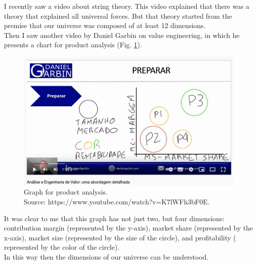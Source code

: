 \documentclass{book}
\begin{document}
I recently saw a video about string theory. This video explained that there was a theory that explained all universal forces. But that theory started from the premise that our universe was composed of at least 12 dimensions. \\

Then I saw another video by Daniel Garbin on value engineering, in which he presents a chart for product analysis (Fig. \ref{fig:productAnalisys}). 

\begin{figure}[h]
	\begin{center}
	    \caption{Graph for product analysis. \\ Source: https://www.youtube.com/watch?v=K7lWFh3bF0E.}
		\label{fig:productAnalisys}
		\centering
		\includegraphics[width=\textwidth]{figures/productSelection.png}
	\end{center}
\end{figure}

It was clear to me that this graph has not just two, but four dimensions: contribution margin (represented by the y-axis), market share (represented by the x-axis), market size (represented by the size of the circle), and profitability ( represented by the color of the circle). \\

In this way then the dimensions of our universe can be understood.
\end{document}
